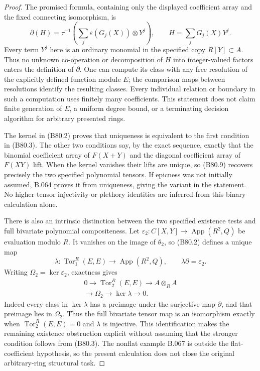 \begin{proof}
The promised formula, containing only the displayed coefficient array
and the fixed connecting isomorphism, is
\[
 \partial(H)=\tau^{-1}
       \left(\sum_j\varepsilon(G_j(X))\otimes Y^j\right),
             \qquad H=\sum_jG_j(X)Y^j.                  \tag{B80.9}
\]
Every term $Y^j$ here is an ordinary monomial in the specified copy
$R[Y]\subset A$. Thus no unknown co-operation or decomposition of
$H$ into integer-valued factors enters the definition of $\partial$.
One can compute its class with any free resolution of the explicitly
defined function module $E$; the comparison maps between resolutions
identify the resulting classes. Every individual relation or boundary
in such a computation uses finitely many coefficients. This statement
does not claim finite generation of $E$, a uniform degree bound, or a
terminating decision algorithm for arbitrary presented rings.

The kernel in (B80.2) proves that uniqueness is equivalent to the
first condition in (B80.3). The other two conditions say, by the exact
sequence, exactly that the binomial coefficient array of $F(X+Y)$
and the diagonal coefficient array of $F(XY)$ lift. When the kernel
vanishes their lifts are unique, so (B80.9) recovers precisely the two
specified polynomial tensors. If epicness was not initially assumed,
B.064 proves it from uniqueness, giving the variant in the statement.
No higher tensor injectivity or plethory identities are inferred from
this binary calculation alone.

There is also an intrinsic distinction between the two specified
existence tests and full bivariate polynomial compositeness.
Let $\varepsilon_2:C[X,Y]\to\operatorname{App}(R^2,Q)$ be evaluation
modulo $R$. It vanishes on the image of $\theta_2$, so (B80.2)
defines a unique map
\[
 \lambda:\operatorname{Tor}_1^R(E,E)\longrightarrow
                  \operatorname{App}(R^2,Q),\qquad
                         \lambda\partial=\varepsilon_2. \tag{B80.10}
\]
Writing $\Omega_2=\ker\varepsilon_2$, exactness gives
\[
\begin{gathered}
 0\longrightarrow\operatorname{Tor}_2^R(E,E)
 \longrightarrow A\otimes_R A\\
 \longrightarrow\Omega_2
 \longrightarrow\ker\lambda\longrightarrow0.
\end{gathered}                                          \tag{B80.11}
\]
Indeed every class in $\ker\lambda$ has a preimage under the
surjective map $\partial$, and that preimage lies in $\Omega_2$.
Thus the full bivariate tensor map is an isomorphism exactly when
$\operatorname{Tor}_2^R(E,E)=0$ and $\lambda$ is injective. This
identification makes the remaining existence obstruction explicit
without assuming that the stronger condition follows from (B80.3).
The nonflat example B.067 is outside the flat-coefficient hypothesis,
so the present calculation does not close the original arbitrary-ring
structural task.
\end{proof}
